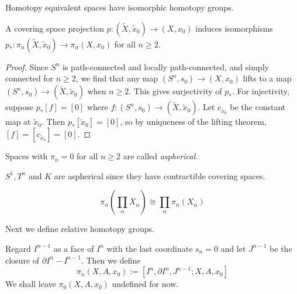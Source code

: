   \begin{corollary}
      Homotopy equivalent spaces have isomorphic
      homotopy groups.
  \end{corollary}

  \begin{proposition}[]
      A covering space projection
      $p \colon \left( \tilde{X}, \tilde{x}_0 \right) \to 
      \left( X, x_0 \right) $ induces isomorphisms
      $p_* \colon \pi_n \left( \tilde{X}, \tilde{x}_0 \right) 
      \to \pi_n \left( X, x_0 \right) $ for all
      $n \ge 2$.
  \end{proposition}

  \begin{proof}
      Since 
      $S^{n}$ is path-connected and locally path-connected,
      and simply connected for $n\ge 2$, we find that
      any map
      $\left( S^{n},s_0 \right) 
      \to \left( X, x_0 \right) $ lifts to a 
      map $\left( S^{n},s_0 \right) \to 
      \left( \tilde{X},\tilde{x}_0 \right) $ when
      $n\ge 2$. This gives surjectivity of
      $p_*$.
      For injectivity, suppose
      $p_* \left[ f \right] = \left[ 0 \right] $ where
      $f \colon \left( S^{n}, s_0 \right) \to 
      \left( \tilde{X},\tilde{x}_0 \right) $.
      Let $c_{\tilde{x}_0}$ be the constant map at
      $\tilde{x}_0$. Then
      $p_* \left[ \tilde{x}_0 \right] =
      \left[ 0 \right] $, so by uniqueness of the
      lifting theorem, 
      $\left[ f \right] = \left[ c_{\tilde{x}_0} \right] =
      \left[ 0 \right] $.
  \end{proof}

  \begin{definition}[Aspherical]
      Spaces with $\pi_n = 0$ for all
      $n\ge 2$ are called \textit{aspherical}.
  \end{definition}

  \begin{corollary}
      $S^{1}, T^{n}$ and $K$ are aspherical since
      they have contractible covering spaces.
  \end{corollary}


  \begin{proposition}[]
      \[
      \pi_n \left( \prod_{\alpha} X_{\alpha} \right) 
      \cong \prod_{\alpha} \pi_n \left( X_{\alpha} \right) 
      \] 
  \end{proposition}

  Next we define relative homotopy groups.

  \begin{definition}
      Regard $I^{n-1}$ as a face of $I^{n}$ with the last
      coordinate $s_n = 0$ and let
      $J^{n-1}$ be the closure of
      $\partial I^{n}- I^{n-1}$. Then
      we define 
      \[
      \pi_n \left( X, A, x_0 \right) 
      := \left[ I^{n},\partial I^{n}, J^{n-1};
      X , A , x_0\right] 
      \] 
      We shall leave $\pi_0 \left( X, A, x_0 \right) $ undefined
      for now.
  \end{definition}

